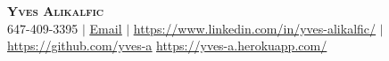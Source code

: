 \begin{center}
	\textbf{\Huge \scshape Yves Alikalfic} \\ \vspace{1pt}
	\small 647-409-3395 $|$
    \href{yalikalfic@yahoo.com}{\underline{Email}} $|$
	\href{https://www.linkedin.com/in/yves-alikalfic/}{\underline{https://www.linkedin.com/in/yves-alikalfic/}} $|$
	\href{https://github.com/yves-a}{\underline{https://github.com/yves-a}}
	\href{https://yves-a.herokuapp.com/}{\underline{https://yves-a.herokuapp.com/}}
\end{center}
